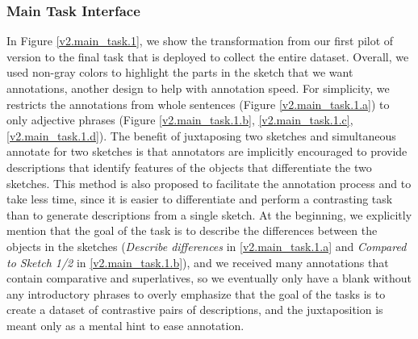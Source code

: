\subsubsection{Main Task Interface}
In Figure \ref{v2.main_task.1}, we show the transformation from our first pilot of version to the final task that is deployed to collect the entire dataset. 
Overall, we used non-gray colors to highlight the parts in the sketch that we want annotations, another design to help with annotation speed. 
For simplicity, we restricts the annotations from whole sentences (Figure \ref{v2.main_task.1.a}) to only adjective phrases (Figure \ref{v2.main_task.1.b}, \ref{v2.main_task.1.c}, \ref{v2.main_task.1.d}). The benefit of juxtaposing two sketches and simultaneous annotate for two sketches is that annotators are implicitly encouraged to provide descriptions that identify features of the objects that differentiate the two sketches. This method is also proposed to facilitate the annotation process and to take less time, since it is easier to differentiate and perform a contrasting task than to generate descriptions from a single sketch. 
At the beginning, we explicitly mention that the goal of the task is to describe the differences between the objects in the sketches (\textit{Describe differences} in \ref{v2.main_task.1.a} and \textit{Compared to Sketch 1/2} in \ref{v2.main_task.1.b}), and we received many annotations that contain comparative and superlatives, so we eventually only have a blank without any introductory phrases to overly emphasize that the goal of the tasks is to create a dataset of contrastive pairs of descriptions, and the juxtaposition is meant only as a mental hint to ease annotation.

